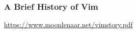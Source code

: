 \begin{frame}[fragile]
  \frametitle{A Brief History of Vim}
  \href{https://www.moonlenaar.net/vimstory.pdf}{https://www.moonlenaar.net/vimstory.pdf}
\end{frame}
